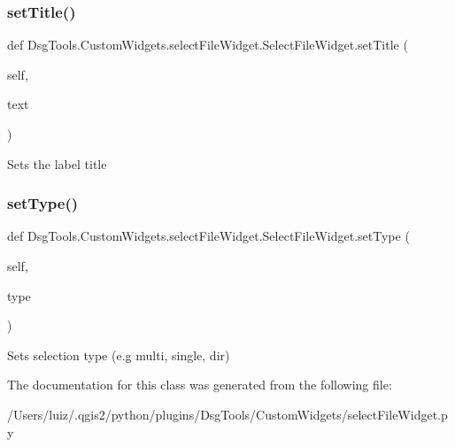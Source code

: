 \subsubsection{\texorpdfstring{set\+Title()}{setTitle()}}
{\footnotesize\ttfamily def Dsg\+Tools.\+Custom\+Widgets.\+select\+File\+Widget.\+Select\+File\+Widget.\+set\+Title (\begin{DoxyParamCaption}\item[{}]{self,  }\item[{}]{text }\end{DoxyParamCaption})}

\begin{DoxyVerb}Sets the label title
\end{DoxyVerb}
 \mbox{\label{class_dsg_tools_1_1_custom_widgets_1_1select_file_widget_1_1_select_file_widget_ae644626e3c62d1de3f35415042defe1f}} 
\subsubsection{\texorpdfstring{set\+Type()}{setType()}}
{\footnotesize\ttfamily def Dsg\+Tools.\+Custom\+Widgets.\+select\+File\+Widget.\+Select\+File\+Widget.\+set\+Type (\begin{DoxyParamCaption}\item[{}]{self,  }\item[{}]{type }\end{DoxyParamCaption})}

\begin{DoxyVerb}Sets selection type (e.g multi, single, dir)
\end{DoxyVerb}
 

The documentation for this class was generated from the following file\+:\begin{DoxyCompactItemize}
\item 
/\+Users/luiz/.\+qgis2/python/plugins/\+Dsg\+Tools/\+Custom\+Widgets/select\+File\+Widget.\+py\end{DoxyCompactItemize}
